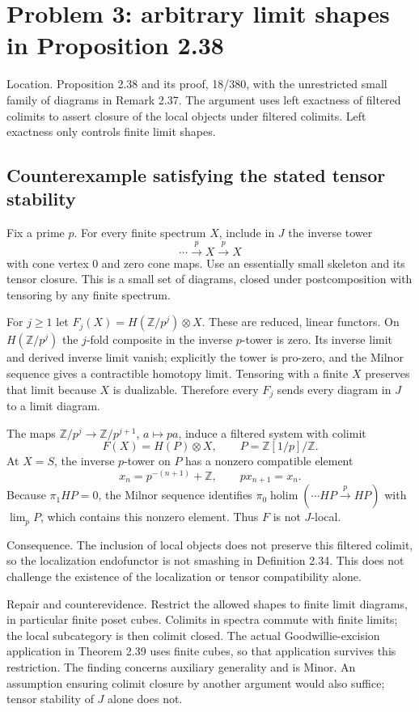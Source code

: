 \documentclass[10pt]{article}
\begin{document}
\section*{Problem 3: arbitrary limit shapes in Proposition 2.38}
Location. Proposition 2.38 and its proof, 18/380, with the unrestricted small family of diagrams in Remark 2.37. The argument uses left exactness of filtered colimits to assert closure of the local objects under filtered colimits. Left exactness only controls finite limit shapes.\par
\subsection*{Counterexample satisfying the stated tensor stability}
Fix a prime \(p\). For every finite spectrum \(X\), include in \(J\) the inverse tower \[\cdots\xrightarrow{p}X\xrightarrow{p}X\] with cone vertex \(0\) and zero cone maps. Use an essentially small skeleton and its tensor closure. This is a small set of diagrams, closed under postcomposition with tensoring by any finite spectrum.\par
For \(j\ge1\) let \(F_j(X)=H(\mathbb Z/p^j)\otimes X\). These are reduced, linear functors. On \(H(\mathbb Z/p^j)\) the \(j\)-fold composite in the inverse \(p\)-tower is zero. Its inverse limit and derived inverse limit vanish; explicitly the tower is pro-zero, and the Milnor sequence gives a contractible homotopy limit. Tensoring with a finite \(X\) preserves that limit because \(X\) is dualizable. Therefore every \(F_j\) sends every diagram in \(J\) to a limit diagram.\par
The maps \(\mathbb Z/p^j\to\mathbb Z/p^{j+1}\), \(a\mapsto pa\), induce a filtered system with colimit \[F(X)=H(P)\otimes X,\qquad P=\mathbb Z[1/p]/\mathbb Z.\] At \(X=S\), the inverse \(p\)-tower on \(P\) has a nonzero compatible element \[x_n=p^{-(n+1)}+\mathbb Z,\qquad p x_{n+1}=x_n.\] Because \(\pi_1 HP=0\), the Milnor sequence identifies \(\pi_0\operatorname{holim}(\cdots HP\xrightarrow p HP)\) with \(\lim_p P\), which contains this nonzero element. Thus \(F\) is not \(J\)-local.\par
Consequence. The inclusion of local objects does not preserve this filtered colimit, so the localization endofunctor is not smashing in Definition 2.34. This does not challenge the existence of the localization or tensor compatibility alone.\par
Repair and counterevidence. Restrict the allowed shapes to finite limit diagrams, in particular finite poset cubes. Colimits in spectra commute with finite limits; the local subcategory is then colimit closed. The actual Goodwillie-excision application in Theorem 2.39 uses finite cubes, so that application survives this restriction. The finding concerns auxiliary generality and is Minor. An assumption ensuring colimit closure by another argument would also suffice; tensor stability of \(J\) alone does not.\par
\end{document}
